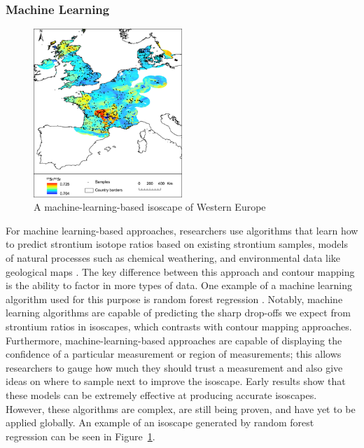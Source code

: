\documentclass[a4paper, 12pt]{article}
\begin{document}
\subsubsection{Machine Learning}
\begin{figure}[htbp]
    \centering
    \includegraphics[width=0.5\textwidth]{machine_learning_isoscape.png}
    \caption{A machine-learning-based isoscape of Western Europe \citep{bataille2018}}
    \label{fig:machine_learning}
\end{figure}
For machine learning-based approaches, researchers use algorithms
that learn how to predict
strontium isotope ratios based on existing strontium samples, models of natural processes such as chemical weathering, and
environmental data like geological maps \citep{bataille2018}. The key difference between
this approach and contour mapping is the ability to factor in more types of data.
One example of a machine learning algorithm used for this purpose is random forest regression
\citep{bataille2018}. Notably, machine learning algorithms are capable of predicting
the sharp drop-offs we expect from strontium ratios in isoscapes, which contrasts
with contour mapping approaches. Furthermore, machine-learning-based approaches are
capable of displaying the confidence of a particular measurement or region of
measurements; this allows researchers to gauge how much they should trust a measurement
and also give ideas on where to sample next to improve the isoscape.
Early results show that these models can be extremely effective at producing accurate
isoscapes. However, these algorithms are complex, are still being proven, and have
yet to be applied globally. An example of an isoscape generated by random forest
regression can be seen in Figure~\ref{fig:machine_learning}.
\end{document}
